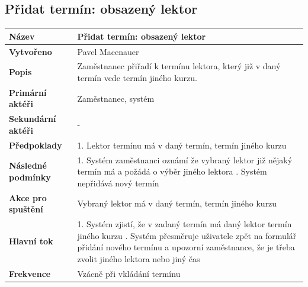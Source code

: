 \documentclass[12pt,a4paper,titlepage,final]{report}
\begin{document}
\subsection{Přidat termín: obsazený lektor}
\begin{center}
    \begin{tabular}{ | p{4.5cm} | p{13cm} | }
    \hline
    \textbf{Název} & Přidat termín: obsazený lektor
    \\ \hline
    
	\textbf{Vytvořeno} & Pavel Macenauer 
	\\ \hline
	
	\textbf{Popis} & Zaměstnanec přiřadí k termínu lektora, který již v daný termín vede termín jiného kurzu.
	\\ \hline
	    
	\textbf{Primární aktéři} & Zaměstnanec, systém
	\\ \hline
	
	\textbf{Sekundární aktéři} & -	   
	\\ \hline
	
	\textbf{Předpoklady} & 1. Lektor termínu má v daný termín, termín jiného kurzu
    \\ \hline
    
    \textbf{Následné podmínky} & 1. Systém zaměstnanci oznámí že vybraný lektor již nějaký termín má a požádá o výběr jiného lektora
	    \newline 2. Systém nepřidává nový termín
    \\ \hline 
        
    \textbf{Akce pro spuštění} & Vybraný lektor má v daný termín, termín jiného kurzu
    \\ \hline
    
    \textbf{Hlavní tok} & 1. Systém zjistí, že v zadaný termín má daný lektor termín jiného kurzu
    	\newline 2. Systém přesměruje uživatele zpět na formulář přidání nového termínu a upozorní zaměstnance, že je třeba zvolit jiného lektora nebo jiný čas
    \\ \hline    
    
	\textbf{Frekvence} & Vzácně při vkládání termínu
	\\ \hline
	\end{tabular}
\end{center}
\end{document}
